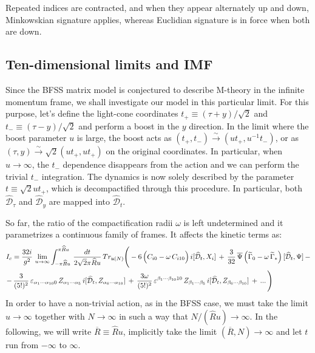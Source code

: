 \documentclass[a4paper,11pt]{article}
\begin{document}
Repeated indices are contracted, and when they appear alternately up and
down, Minkowskian signature applies, whereas Euclidian signature is in force
when both are down.

\subsection{Ten-dimensional limits and IMF}
Since the BFSS matrix model is conjectured to describe M-theory in the infinite momentum frame,
we shall investigate our model in this particular limit. For this purpose, let's define 
the light-cone coordinates $t_+ \equiv (\tau + y)/\sqrt{2}$ and $t_- \equiv (\tau - y)/\sqrt{2}$ 
and perform a boost in the $y$ direction. In the limit where the boost parameter $u$ is large,
the boost acts as $(t_{+},t_{-}) \xrightarrow{\sim} (u t_{+}, u^{-1} t_{-})$, or as
$(\tau,y) \xrightarrow{\sim} \sqrt{2} (u t_{+}, u t_{+})$ on the original coordinates.
In particular, when $u \rightarrow \infty$, the $t_{-}$ dependence disappears from the action
and we can perform the trivial $t_{-}$ integration. The dynamics is now solely described by the parameter 
$t \equiv \sqrt{2} u t_{+}$, which is decompactified through this procedure. In particular, both 
$\mathcal{\widehat{D}}_{\tau}$ and $\mathcal{\widehat{D}}_y$ are mapped into $\mathcal{\widehat{D}}_{t}$.

So far, the ratio of the compactification radii $\omega$ is left undetermined and it parametrizes a continuous
family of frames. It affects the kinetic terms as:
\begin{align} \label{eq:comp2}
I_c &= \frac{32i}{g^2}\,\lim_{u\rightarrow \infty} \int_{-\pi\widehat{R}u}^{\pi\widehat{R}u}\,
\frac{dt}{2 \sqrt{2} \pi \widehat{R}u} \,Tr_{\frak{u}(N)}\Bigg( -6\,\Big(C_{i0}-\omega\, C_{i10}\Big)\,
i[\mathcal{\widehat{D}}_t,X_i]\,+\, \frac{3}{32}\,\overline{\Psi}\,\Big(\widetilde{\Gamma}_{0}-
\omega\,\widetilde{\Gamma}_{*}\Big)\,[\mathcal{\widehat{D}}_t,\Psi]\,-\nonumber\\ 
-&\,\frac{3}{(5!)^2}\,\varepsilon_{\alpha_1\cdots \alpha_{10}0}\,
Z_{\alpha_1\cdots \alpha_5}\, i[\mathcal{\widehat{D}}_t,Z_{\alpha_6\cdots \alpha_{10}}]\,
+\,\frac{3\omega}{(5!)^2}\,\varepsilon^{\beta_1\cdots \beta_{10}10}\,
Z_{\beta_1\cdots \beta_5}\, i[\mathcal{\widehat{D}}_t,Z_{\beta_6 \cdots \beta_{10}}]\,+\, ... \,\Bigg)
\end{align} 
In order to have a non-trivial action, as in the BFSS case, we must take the limit $u \rightarrow \infty$
together with $N \rightarrow \infty$ in such a way that $N/(\widehat{R}u) \rightarrow \infty$.
In the following, we will write $\overline{R} \equiv \widehat{R}u$, implicitly take the limit 
$(\overline{R},N) \rightarrow \infty $ and let $t$ run from $-\infty$ to $\infty$.
 
\end{document}
